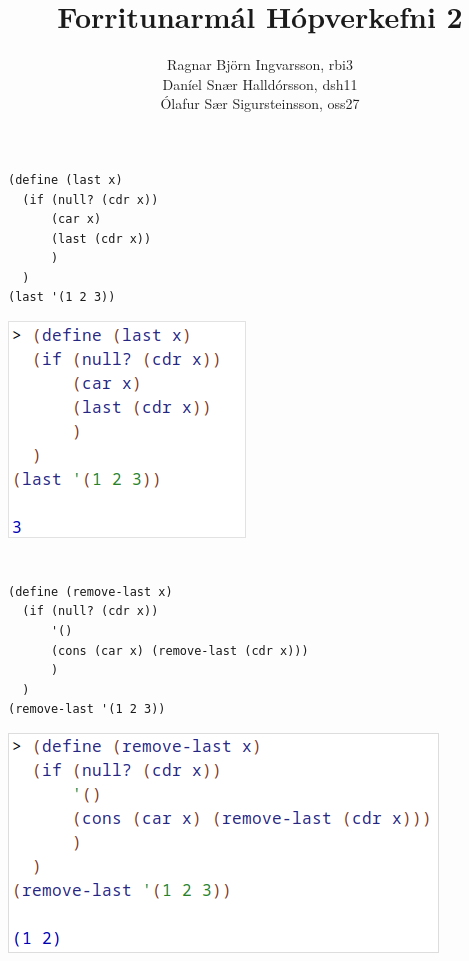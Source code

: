 \documentclass{article}
\title{Forritunarmál Hópverkefni 2}
\author{Ragnar Björn Ingvarsson, rbi3 \\ Daníel Snær Halldórsson, dsh11 
\\ Ólafur Sær Sigursteinsson, oss27}
\begin{document}
	
	\maketitle
	
	\section{}
	\begin{verbatim}
(define (last x)
  (if (null? (cdr x))
      (car x)
      (last (cdr x))
      )
  )
(last '(1 2 3))
	\end{verbatim}
		\includegraphics[scale=0.6]{last.png}

	\newpage
	\section{}
	\begin{verbatim}
(define (remove-last x)
  (if (null? (cdr x))
      '()
      (cons (car x) (remove-last (cdr x)))
      )
  )
(remove-last '(1 2 3))
	\end{verbatim}
		\includegraphics[scale=0.6]{remove-last.png}

	\newpage
\end{document}
